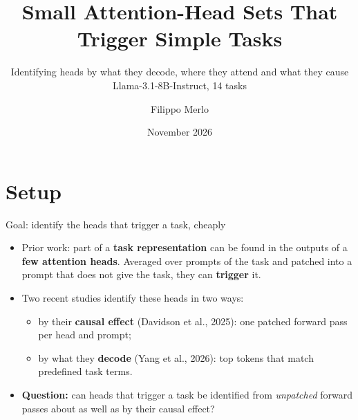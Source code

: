\documentclass[aspectratio=169,11pt,xcolor=table]{beamer}
\title{Small Attention-Head Sets That Trigger Simple Tasks}
\subtitle{Identifying heads by what they decode, where they attend and what they cause\\
\small Llama-3.1-8B-Instruct, 14 tasks}
\author{Filippo Merlo}
\date{November 2026}
\newcommand{\spaced}{\setlength{\itemsep}{0.55em}}
\newcommand{\nl}{\textbackslash n}
\begin{document}
\begin{frame}
\titlepage
\end{frame}

\section{Setup}

\begin{frame}{Goal: identify the heads that trigger a task, cheaply}
\begin{itemize}\spaced
\item Prior work: part of a \textbf{task representation} can be found in the outputs of a
      \textbf{few attention heads}. Averaged over prompts of the task and patched into a
      prompt that does not give the task, they can \textbf{trigger} it.
\item Two recent studies identify these heads in two ways:
  \begin{itemize}
  \item by their \textbf{causal effect} (Davidson et al., 2025): one patched forward pass per head and prompt;
  \item by what they \textbf{decode} (Yang et al., 2026): top tokens that match predefined task terms.
  \end{itemize}
\item \textbf{Question:} can heads that trigger a task be identified from \emph{unpatched} forward
      passes about as well as by their causal effect?
\end{itemize}

\vspace{0.6em}
\centering
{}
\end{frame}
\end{document}
